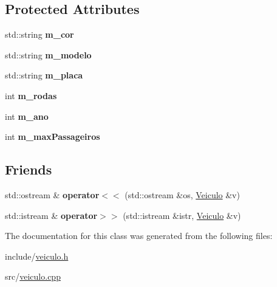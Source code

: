 \subsection*{Protected Attributes}
\begin{DoxyCompactItemize}
\item 
\mbox{\label{classVeiculo_a5c78b659e66b7689fd9870033e5d57c5}} 
std\+::string {\bfseries m\+\_\+cor}
\item 
\mbox{\label{classVeiculo_a2858cfeaec1aeb6c31c86797a17e6c93}} 
std\+::string {\bfseries m\+\_\+modelo}
\item 
\mbox{\label{classVeiculo_ac8810cebe05a131016ef27cc2960e15b}} 
std\+::string {\bfseries m\+\_\+placa}
\item 
\mbox{\label{classVeiculo_ae24a39af503298a96c8381e036712647}} 
int {\bfseries m\+\_\+rodas}
\item 
\mbox{\label{classVeiculo_a326795a1e488fd6cd3aec88ad3b9c2d7}} 
int {\bfseries m\+\_\+ano}
\item 
\mbox{\label{classVeiculo_a6631ba7e694c5a75e68022ee26ddd39d}} 
int {\bfseries m\+\_\+max\+Passageiros}
\end{DoxyCompactItemize}
\subsection*{Friends}
\begin{DoxyCompactItemize}
\item 
\mbox{\label{classVeiculo_aadf477947c82fbb4cc80200ae6c1ba3c}} 
std\+::ostream \& {\bfseries operator$<$$<$} (std\+::ostream \&os, \hyperlink{classVeiculo}{Veiculo} \&v)
\item 
\mbox{\label{classVeiculo_a8a57124aff154b23f7bf3ce43d19d5ad}} 
std\+::istream \& {\bfseries operator$>$$>$} (std\+::istream \&istr, \hyperlink{classVeiculo}{Veiculo} \&v)
\end{DoxyCompactItemize}


The documentation for this class was generated from the following files\+:\begin{DoxyCompactItemize}
\item 
include/\hyperlink{veiculo_8h}{veiculo.\+h}\item 
src/\hyperlink{veiculo_8cpp}{veiculo.\+cpp}\end{DoxyCompactItemize}
